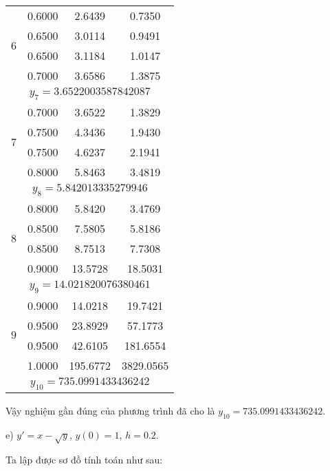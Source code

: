 \begin{longtable}{|c|c|c|c|}
\multirow{4}{*}{$6$}
&0.6000 &2.6439 &0.7350\\ \cline{2-4}
&0.6500 &3.0114 &0.9491\\ \cline{2-4}
&0.6500 &3.1184 &1.0147\\ \cline{2-4}
&0.7000 &3.6586 &1.3875\\ \hline
\multicolumn{4}{|c|}{$y_7 = 3.6522003587842087$}\\ \hline

\multirow{4}{*}{$7$}
&0.7000 &3.6522 &1.3829\\ \cline{2-4}
&0.7500 &4.3436 &1.9430\\ \cline{2-4}
&0.7500 &4.6237 &2.1941\\ \cline{2-4}
&0.8000 &5.8463 &3.4819\\ \hline
\multicolumn{4}{|c|}{$y_8 = 5.842013335279946$}\\ \hline

\multirow{4}{*}{$8$}
&0.8000 &5.8420 &3.4769\\ \cline{2-4}
&0.8500 &7.5805 &5.8186\\ \cline{2-4}
&0.8500 &8.7513 &7.7308\\ \cline{2-4}
&0.9000 &13.5728 &18.5031\\ \hline
\multicolumn{4}{|c|}{$y_9 = 14.021820076380461$}\\ \hline

\multirow{4}{*}{$9$}
&0.9000 &14.0218 &19.7421\\ \cline{2-4}
&0.9500 &23.8929 &57.1773\\ \cline{2-4}
&0.9500 &42.6105 &181.6554\\ \cline{2-4}
&1.0000 &195.6772 &3829.0565\\ \hline
\multicolumn{4}{|c|}{$y_{10} = 735.0991433436242$}\\ \hline

\end{longtable}

Vậy nghiệm gần đúng của phương trình đã cho là $y_{10} = 735.0991433436242$.\par

e) $y'=x-\sqrt{y}$, $y(0)=1$, $h=0.2$.\par
Ta lập được sơ đồ tính toán như sau:

